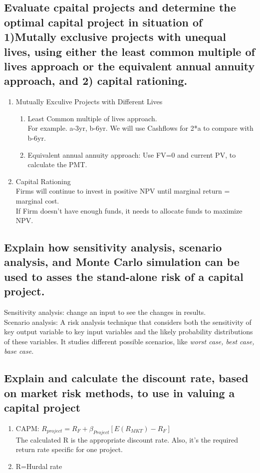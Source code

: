 \documentclass{article}
\newcommand{\be}{\begin{enumerate}}
\newcommand{\ee}{\end{enumerate}}
\begin{document}
\subsection{Evaluate cpaital projects and determine the optimal capital project in situation
of 1)Mutally exclusive projects with unequal lives, using either the least common multiple
of lives approach or the equivalent annual annuity approach, and 2) capital rationing.}
\be
    \item Mutually Exculive Projects with Different Lives
        \be
            \item Least Common multiple of lives approach. 
                \\ For example. a-3yr, b-6yr. We will use Cashflows for 2*a to compare
                with b-6yr.
            \item Equivalent annual annuity approach: Use FV=0 and current PV, to calculate
                the PMT.
        \ee
    \item Capital Rationing
        \\Firms will continue to invest in positive NPV until marginal return = marginal cost.
        \\If Firm doesn't have enough funds, it needs to allocate funds to maximize NPV.
\ee
\subsection{Explain how sensitivity analysis, scenario analysis, and Monte Carlo simulation
can be used to asses the stand-alone risk of a capital project.}
Sensitivity analysis: change an input to see the changes in results.
\\Scenario analysis: A risk analysis technique that considers both the sensitivity of key output
variable to key input variables and the likely probability distributions of these variables. It studies
different possible scenarios, like {\it worst case, best case, base case.}
\subsection{Explain and calculate the discount rate, based on market risk methods, to use
in valuing a capital project}
\be
    \item CAPM: $R_{project}=R_F + \beta_{Project}[E(R_{MKT})-R_F]$
    \\ The calculated R is the appropriate discount rate. Also, it's the required return rate
    specific for one project.
    \item R=Hurdal rate
\ee
\end{document}
